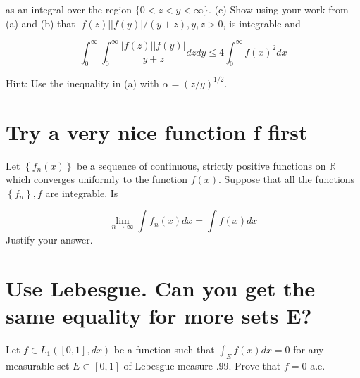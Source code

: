 \documentclass[lang=cn,11pt]{elegantbook}
\begin{document}
as an integral over the region $\{0<z<y<\infty\}$.
(c) Show using your work from (a) and (b) that $|f(z)||f(y)| /(y+z), y, z>0$, is integrable and

$$
\int_0^{\infty} \int_0^{\infty} \frac{|f(z)||f(y)|}{y+z} d z d y \leq 4 \int_0^{\infty} f(x)^2 d x
$$


Hint: Use the inequality in (a) with $\alpha=(z / y)^{1 / 2}$.\newline
\newline
\newline
\newline
\newline
\newline
\newline
\newline
\newline








\section{Try a very nice function f first}
Let $\left\{f_n(x)\right\}$ be a sequence of continuous, strictly positive functions on $\mathbb{R}$ which converges uniformly to the function $f(x)$. Suppose that all the functions $\left\{f_n\right\}, f$ are integrable. Is

$$
\lim _{n \rightarrow \infty} \int f_n(x) d x=\int f(x) d x
$$
Justify your answer.\newline
\newline
\newline
\newline
\newline
\newline
\newline
\newline
\newline





\section{Use Lebesgue. Can you get the same equality for more sets E?}

Let $f \in L_1([0,1], d x)$ be a function such that $\int_E f(x) d x=0$ for any measurable set $E \subset[0,1]$ of Lebesgue measure .99. Prove that $f=0$ a.e.\newline
\newline
\newline
\newline
\newline
\newline
\newline
\newline
\newline
\end{document}
